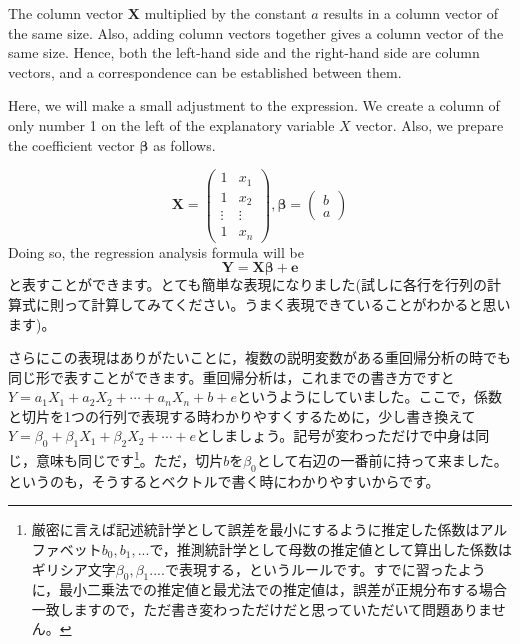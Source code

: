 \documentclass{ltjsbook}
\begin{document}
The column vector $\bm{X}$ multiplied by the constant $a$ results in a column vector of the same size. Also, adding column vectors together gives a column vector of the same size. Hence, both the left-hand side and the right-hand side are column vectors, and a correspondence can be established between them.

Here, we will make a small adjustment to the expression. We create a column of only number 1 on the left of the explanatory variable $X$ vector. Also, we prepare the coefficient vector $\bm{\beta}$ as follows.

\[
	\bm{X} =
	\begin{pmatrix}
		1      & x_1    \\
		1      & x_2    \\
		\vdots & \vdots \\
		1      & x_n
	\end{pmatrix},
	\bm{\beta}=
	\begin{pmatrix}
		b \\
		a
	\end{pmatrix}
\]
Doing so, the regression analysis formula will be
\[ \bm{Y} = \bm{X\beta} + \bm{e} \]
と表すことができます。とても簡単な表現になりました(試しに各行を行列の計算式に則って計算してみてください。うまく表現できていることがわかると思います)。

さらにこの表現はありがたいことに，複数の説明変数がある重回帰分析の時でも同じ形で表すことができます。重回帰分析は，これまでの書き方ですと$Y = a_1 X_1 + a_2 X_2 + \cdots + a_n X_n + b + e$というようにしていました。ここで，係数と切片を1つの行列で表現する時わかりやすくするために，少し書き換えて$Y = \beta_0 + \beta_1 X_1 + \beta_2 X_2 +\cdots +e $としましょう。記号が変わっただけで中身は同じ，意味も同じです\footnote{厳密に言えば記述統計学として誤差を最小にするように推定した係数はアルファベット$b_0,b_1,...$で，推測統計学として母数の推定値として算出した係数はギリシア文字$\beta_0,\beta_1....$で表現する，というルールです。すでに習ったように，最小二乗法での推定値と最尤法での推定値は，誤差が正規分布する場合一致しますので，ただ書き変わっただけだと思っていただいて問題ありません。}。ただ，切片$b$を$\beta_0$として右辺の一番前に持って来ました。というのも，そうするとベクトルで書く時にわかりやすいからです。
\end{document}
